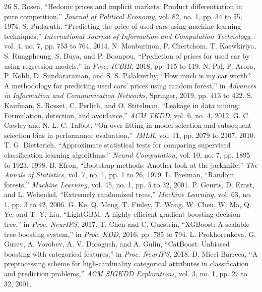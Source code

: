 \documentclass[journal,10pt]{IEEEtran}
\begin{document}
\begin{thebibliography}{26}
 S. Rosen, ``Hedonic prices and implicit markets: Product differentiation in pure competition,'' \emph{Journal of Political Economy}, vol. 82, no. 1, pp. 34 to 55, 1974.
 S. Pudaruth, ``Predicting the price of used cars using machine learning techniques,'' \emph{International Journal of Information and Computation Technology}, vol. 4, no. 7, pp. 753 to 764, 2014.
 N. Monburinon, P. Chertchom, T. Kaewkiriya, S. Rungpheung, S. Buya, and P. Boonpou, ``Prediction of prices for used car by using regression models,'' in \emph{Proc. ICBIR}, 2018, pp. 115 to 119.
 N. Pal, P. Arora, P. Kohli, D. Sundararaman, and S. S. Palakurthy, ``How much is my car worth? A methodology for predicting used cars' prices using random forest,'' in \emph{Advances in Information and Communication Networks}, Springer, 2019, pp. 413 to 422.
 S. Kaufman, S. Rosset, C. Perlich, and O. Stitelman, ``Leakage in data mining: Formulation, detection, and avoidance,'' \emph{ACM TKDD}, vol. 6, no. 4, 2012.
 G. C. Cawley and N. L. C. Talbot, ``On over-fitting in model selection and subsequent selection bias in performance evaluation,'' \emph{JMLR}, vol. 11, pp. 2079 to 2107, 2010.
 T. G. Dietterich, ``Approximate statistical tests for comparing supervised classification learning algorithms,'' \emph{Neural Computation}, vol. 10, no. 7, pp. 1895 to 1923, 1998.
 B. Efron, ``Bootstrap methods: Another look at the jackknife,'' \emph{The Annals of Statistics}, vol. 7, no. 1, pp. 1 to 26, 1979.
 L. Breiman, ``Random forests,'' \emph{Machine Learning}, vol. 45, no. 1, pp. 5 to 32, 2001.
 P. Geurts, D. Ernst, and L. Wehenkel, ``Extremely randomized trees,'' \emph{Machine Learning}, vol. 63, no. 1, pp. 3 to 42, 2006.
 G. Ke, Q. Meng, T. Finley, T. Wang, W. Chen, W. Ma, Q. Ye, and T.-Y. Liu, ``LightGBM: A highly efficient gradient boosting decision tree,'' in \emph{Proc. NeurIPS}, 2017.
 T. Chen and C. Guestrin, ``XGBoost: A scalable tree boosting system,'' in \emph{Proc. KDD}, 2016, pp. 785 to 794.
 L. Prokhorenkova, G. Gusev, A. Vorobev, A. V. Dorogush, and A. Gulin, ``CatBoost: Unbiased boosting with categorical features,'' in \emph{Proc. NeurIPS}, 2018.
 D. Micci-Barreca, ``A preprocessing scheme for high-cardinality categorical attributes in classification and prediction problems,'' \emph{ACM SIGKDD Explorations}, vol. 3, no. 1, pp. 27 to 32, 2001.

\end{thebibliography}
\end{document}
